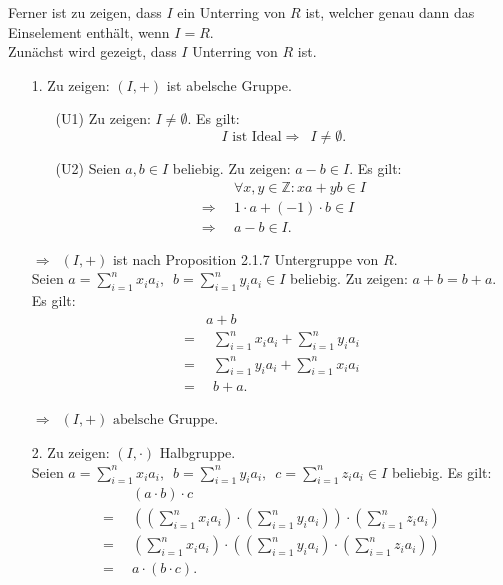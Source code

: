 \documentclass[12pt]{article}
\newcommand{\df}{\Longrightarrow \enspace}
\begin{document}
\begin{enumerate}
Ferner ist zu zeigen, dass $I$ ein Unterring von $R$ ist, welcher genau dann das Einselement enthält, wenn $I = R$. \\

Zunächst wird gezeigt, dass $I$ Unterring von $R$ ist.
\begin{enumerate}
\item[1.] Zu zeigen: $(I,+)$ ist abelsche Gruppe.
\begin{enumerate}
	\item[(U1)] Zu zeigen: $I \neq \emptyset$. Es gilt:
	$$I \text{ ist Ideal} \df I \neq \emptyset.$$
	
	\item[(U2)] Seien $a,b \in I$ beliebig. Zu zeigen: $a-b \in I$. Es gilt:
	\begin{align*}
		&\forall x, y \in \mathbb{Z}: x a + y b \in I \\
		\df &1 \cdot a + (-1) \cdot b \in I \\
		\df &a - b \in I.
	\end{align*}
	
\end{enumerate}

$\df (I,+)$ ist nach Proposition 2.1.7 Untergruppe von $R$. \\

Seien $a = \sum\limits_{i=1}^{n}x_i a_i, \enspace b = \sum\limits_{i=1}^{n}y_i a_i \in I$ beliebig. Zu zeigen: $a + b = b + a$. Es gilt:
\begin{align*}
	&a + b \\
	= &\enspace \sum_{i=1}^{n}x_i a_i + \sum_{i=1}^{n}y_i a_i \\
	= &\enspace \sum_{i=1}^{n}y_i a_i + \sum_{i=1}^{n}x_i a_i \\
	= &\enspace b + a.
\end{align*}

$\df (I,+) \text{ abelsche Gruppe}$.

\item[2.] Zu zeigen: $(I,\cdot)$ Halbgruppe. \\
Seien $a = \sum\limits_{i=1}^{n}x_i a_i, \enspace b = \sum\limits_{i=1}^{n}y_i a_i, \enspace c = \sum\limits_{i=1}^{n}z_i a_i \in I$ beliebig. Es gilt:
\begin{align*}
	&(a \cdot b) \cdot c \\
	= \enspace &((\sum_{i=1}^{n}x_i a_i) \cdot (\sum_{i=1}^{n}y_i a_i)) \cdot (\sum_{i=1}^{n}z_i a_i) \\
	= \enspace &(\sum_{i=1}^{n}x_i a_i) \cdot ((\sum_{i=1}^{n}y_i a_i) \cdot (\sum_{i=1}^{n}z_i a_i)) \\
	= \enspace &a \cdot (b \cdot c).
\end{align*}


\end{enumerate}
\end{enumerate}
\end{document}
